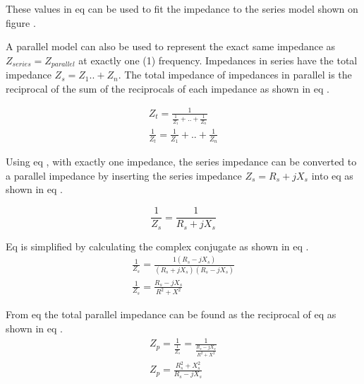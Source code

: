 These values in eq  can be used to fit the impedance to the series model shown on figure .

A parallel model can also be used to represent the exact same impedance as $Z_{series} = Z_{parallel}$ at exactly one (1) frequency. Impedances in series have the total impedance $Z_s = Z_1..+Z_n$. The total impedance of impedances in parallel is the reciprocal of the sum of the reciprocals of each impedance as shown in eq .

\begin{equation}\label{eq:4_1_5_ParallelModelx1}
    \begin{split}
        Z_t = \frac{1}{\frac{1}{Z_1}+..+\frac{1}{Z_n}} \\
        \frac{1}{Z_t} = \frac{1}{Z_1}+..+\frac{1}{Z_n}  
    \end{split}
\end{equation}

Using eq , with exactly one impedance, the series impedance can be converted to a parallel impedance by inserting the series impedance $Z_s = R_s + jX_s$ into eq  as shown in eq .

\begin{equation}\label{eq:4_1_5_ParallelModelx2}
     \frac{1}{Z_s} = \frac{1}{R_s+jX_s}
\end{equation}

Eq  is simplified by calculating the complex conjugate as shown in eq .
\begin{equation}\label{eq:4_1_5_ParallelModelx3}
    \begin{split}
        \frac{1}{Z_s} = \frac{1(R_s-jX_s)}{(R_s+jX_s)(R_s-jX_s)} \\
        \frac{1}{Z_s} = \frac{R_s - jX_s}{R^2 + X^2}
    \end{split}
\end{equation}

From eq  the total parallel impedance can be found as the reciprocal of eq  as shown in eq .
\begin{equation}\label{eq:4_1_5_ParallelModelx4}
    \begin{split}
        Z_p = \frac{1}{\frac{1}{Z_s}} = \frac{1}{\frac{R_s - jX_s}{R^2 + X^2}} \\
        Z_p = \frac{R_s^2 + X_s^2}{R_s - jX_s}
    \end{split}
\end{equation}

